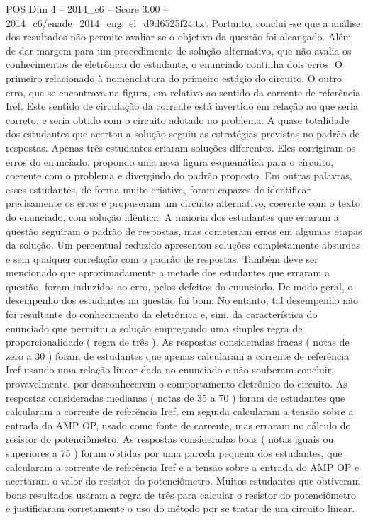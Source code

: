 \begin{textsample}{POS Dim 4 – 2014\_c6 – Score 3.00 – 2014\_c6/enade\_2014\_eng\_el\_d9d6525f24.txt}
Portanto, conclui -se que a análise dos resultados não permite avaliar se o objetivo da questão foi alcançado.
Além de dar margem para um procedimento de solução alternativo, que não avalia os conhecimentos de eletrônica do estudante, o enunciado continha dois erros.
O primeiro relacionado à nomenclatura do primeiro estágio do circuito.
O outro erro, que se encontrava na figura, era relativo ao sentido da corrente de referência Iref.
Este sentido de circulação da corrente está invertido em relação ao que seria correto, e seria obtido com o circuito adotado no problema.
A quase totalidade dos estudantes que acertou a solução seguiu as estratégias previstas no padrão de respostas.
Apenas três estudantes criaram soluções diferentes.
Eles corrigiram os erros do enunciado, propondo uma nova figura esquemática para o circuito, coerente com o problema e divergindo do padrão proposto.
Em outras palavras, esses estudantes, de forma muito criativa, foram capazes de identificar precisamente os erros e propuseram um circuito alternativo, coerente com o texto do enunciado, com solução idêntica.
A maioria dos estudantes que erraram a questão seguiram o padrão de respostas, mas cometeram erros em algumas etapas da solução.
Um percentual reduzido apresentou soluções completamente absurdas e sem qualquer correlação com o padrão de respostas.
Também deve ser mencionado que aproximadamente a metade dos estudantes que erraram a questão, foram induzidos ao erro, pelos defeitos do enunciado.
De modo geral, o desempenho dos estudantes na questão foi bom.
No entanto, tal desempenho não foi resultante do conhecimento da eletrônica e, sim, da característica do enunciado que permitiu a solução empregando uma simples regra de proporcionalidade ( regra de três ).
As respostas consideradas fracas ( notas de zero a 30 ) foram de estudantes que apenas calcularam a corrente de referência Iref usando uma relação linear dada no enunciado e não souberam concluir, provavelmente, por desconhecerem o comportamento eletrônico do circuito.
As respostas consideradas medianas ( notas de 35 a 70 ) foram de estudantes que calcularam a corrente de referência Iref, em seguida calcularam a tensão sobre a entrada do AMP OP, usado como fonte de corrente, mas erraram no cálculo do resistor do potenciômetro.
As respostas consideradas boas ( notas iguais ou superiores a 75 ) foram obtidas por uma parcela pequena dos estudantes, que calcularam a corrente de referência Iref e a tensão sobre a entrada do AMP OP e acertaram o valor do resistor do potenciômetro.
Muitos estudantes que obtiveram bons resultados usaram a regra de três para calcular o resistor do potenciômetro e justificaram corretamente o uso do método por se tratar de um circuito linear.

\end{textsample}
